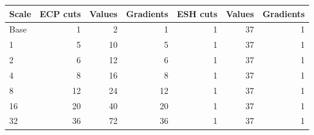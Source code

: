 \begin{tabular}{lrrrrrr}
\toprule
Scale & ECP cuts & Values & Gradients & ESH cuts & Values & Gradients \\
\midrule
Base & 1 & 2 & 1 & 1 & 37 & 1 \\
1 & 5 & 10 & 5 & 1 & 37 & 1 \\
2 & 6 & 12 & 6 & 1 & 37 & 1 \\
4 & 8 & 16 & 8 & 1 & 37 & 1 \\
8 & 12 & 24 & 12 & 1 & 37 & 1 \\
16 & 20 & 40 & 20 & 1 & 37 & 1 \\
32 & 36 & 72 & 36 & 1 & 37 & 1 \\
\bottomrule
\end{tabular}
